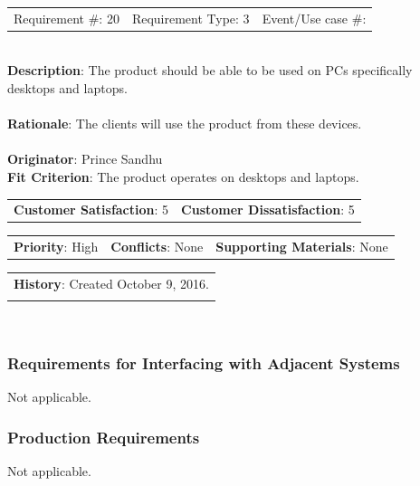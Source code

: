 \documentclass[12pt, titlepage]{article}
\begin{document}
\begin{reqbox}

\begin{tabular}{lll}
Requirement \#: 20 & Requirement Type: 3 & Event/Use case \#: \\
\end{tabular} \\

\textbf{Description}: The product should be able to be used on PCs specifically desktops and laptops. \\ \\
\textbf{Rationale}: The clients will use the product from these devices. \\ \\
\textbf{Originator}: Prince Sandhu \\
\textbf{Fit Criterion}: The product operates on desktops and laptops. \\

\begin{tabular}{ll}
\textbf{Customer Satisfaction}: 5 & \textbf{Customer Dissatisfaction}: 5 \\
\end{tabular}

\begin{tabular}{lll}
\textbf{Priority}: High & \textbf{Conflicts}: None & \textbf{Supporting Materials}: None \\
\end{tabular}

\begin{tabular}{l}
\textbf{History}: Created October 9, 2016.\\ \\
\end{tabular} \\

\end{reqbox}

\subsubsection{Requirements for Interfacing with Adjacent Systems}
Not applicable.
\subsubsection{Production Requirements}
Not applicable.
\end{document}
